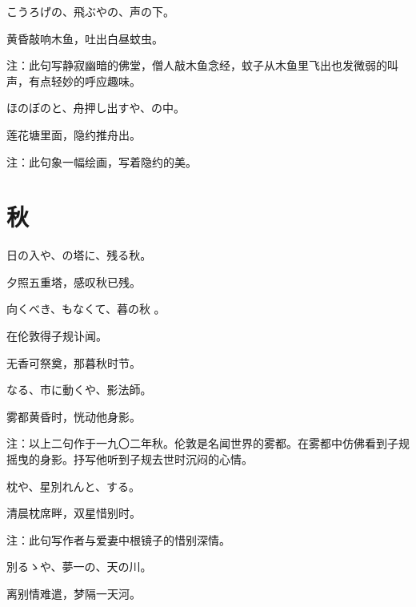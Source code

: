 \begin{haiku}
    {\FH こうろげの、飛ぶやの、声の下。}

    {\FK 黄昏敲响木鱼，吐出白昼蚊虫。}

    {\FT 注：此句写静寂幽暗的佛堂，僧人敲木鱼念经，蚊子从木鱼里飞出也发微弱的叫声，有点轻妙的呼应趣味。}
\end{haiku}

\begin{haiku}
    {\FH ほのぼのと、舟押し出すや、の中。}

    {\FK 莲花塘里面，隐约推舟出。}

    {\FT 注：此句象一幅绘画，写着隐约的美。}
\end{haiku}

\section{\FK 秋}

\setcounter{haikucounter}{0}

\begin{haiku}
    {\FH 日の入や、の塔に、残る秋。}

    {\FK 夕照五重塔，感叹秋已残。}
\end{haiku}

\begin{haiku}
    {\FH {}向くべき、もなくて、暮の秋
。}

{\FK 在伦敦得子规讣闻。}

{\FK 无香可祭奠，那暮秋时节。}
\end{haiku}

\begin{haiku}
    {\FH {}なる、市に動くや、影法師。}

    {\FK 雾都黄昏时，恍动他身影。}

    {\FT 注：以上二句作于一九〇二年秋。伦敦是名闻世界的雾都。在雾都中仿佛看到子规摇曳的身影。抒写他听到子规去世时沉闷的心情。}
\end{haiku}

\begin{haiku}
    {\FH 枕や、星別れんと、する。}

    {\FK 清晨枕席畔，双星惜别时。}

    {\FT 注：此句写作者与爱妻中根镜子的惜别深情。}
\end{haiku}

\begin{haiku}
    {\FH 別るゝや、夢一の、天の川。}

    {\FK 离别情难遣，梦隔一天河。}
\end{haiku}

